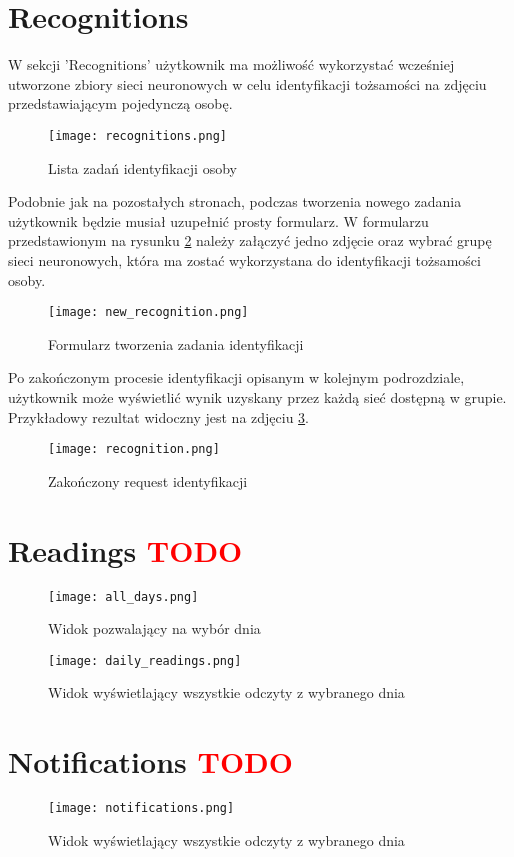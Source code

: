 \section{Recognitions}
W sekcji 'Recognitions' użytkownik ma możliwość wykorzystać wcześniej utworzone zbiory sieci neuronowych w celu identyfikacji tożsamości na zdjęciu przedstawiającym pojedynczą osobę.
\begin{figure}[H]
	\centering
	\texttt{[image: recognitions.png]}
	\caption{Lista zadań identyfikacji osoby}
	\label{fig:recognitions}
\end{figure}
Podobnie jak na pozostałych stronach, podczas tworzenia nowego zadania użytkownik będzie musiał uzupełnić prosty formularz. W formularzu przedstawionym na rysunku \ref{fig:new_recognition} należy załączyć jedno zdjęcie oraz wybrać grupę sieci neuronowych, która ma zostać wykorzystana do identyfikacji tożsamości osoby.
\begin{figure}[H]
	\centering
	\texttt{[image: new\_recognition.png]}
	\caption{Formularz tworzenia zadania identyfikacji}
	\label{fig:new_recognition}
\end{figure}
Po zakończonym procesie identyfikacji opisanym w kolejnym podrozdziale, użytkownik może wyświetlić wynik uzyskany przez każdą sieć dostępną w grupie. Przykładowy rezultat widoczny jest na zdjęciu \ref{fig:recognition}.
\begin{figure}[H]
	\centering
	\texttt{[image: recognition.png]}
	\caption{Zakończony request identyfikacji}
	\label{fig:recognition}
\end{figure}

\section{Readings \textcolor{red}{TODO}}
\begin{figure}[H]
	\centering
	\texttt{[image: all\_days.png]}
	\caption{Widok pozwalający na wybór dnia}
	\label{fig:all_days}
\end{figure}
\begin{figure}[H]
	\centering
	\texttt{[image: daily\_readings.png]}
	\caption{Widok wyświetlający wszystkie odczyty z wybranego dnia}
	\label{fig:daily_readings}
\end{figure}

\section{Notifications \textcolor{red}{TODO}}
\begin{figure}[H]
	\centering
	\texttt{[image: notifications.png]}
	\caption{Widok wyświetlający wszystkie odczyty z wybranego dnia}
	\label{fig:daily_readings}
\end{figure}